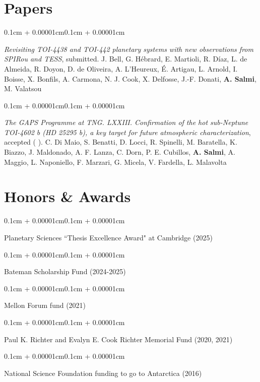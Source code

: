 \documentclass[10pt,letterpaper]{article}
\newenvironment{onecolentry}{
    \begin{adjustwidth}{0.1cm + 0.00001cm}{0.1cm + 0.00001cm}
}{
    \end{adjustwidth}
}
\let\hrefWithoutArrow\href
\renewcommand{\href}[2]{%
    \hrefWithoutArrow{#1}{%
        \ifthenelse{\equal{#2}{}}{}{#2 }%
        \raisebox{.15ex}{\footnotesize\faExternalLink*}%
    }%
}
\begin{document}
    \section{Papers}
        \begin{onecolentry}
        \textit{Revisiting TOI-4438 and TOI-442 planetary systems with new
observations from SPIRou and TESS}, submitted.
        \newline
        J. Bell, G. Hébrard, E. Martioli, R. Díaz, L. de Almeida, R. Doyon, D. de Oliveira, A. L'Heureux, É. Artigau, L. Arnold, I. Boisse, X. Bonfils, A. Carmona, N. J. Cook, X. Delfosse, J.-F. Donati, \textbf{A. Salmi}, M. Valatsou
        \end{onecolentry}
        \vspace{0.1cm}
        \vspace{0.1cm}
        \begin{onecolentry}
        \textit{The GAPS Programme at TNG. LXXIII. Confirmation of the hot sub-Neptune TOI-4602 b (HD 25295 b), a key target for future atmospheric characterization}, accepted (\href{https://arxiv.org/abs/2604.11728}{arXiv}).
        \newline
        C. Di Maio, S. Benatti, D. Locci, R. Spinelli, M. Baratella, K. Biazzo, J. Maldonado, A. F. Lanza, C. Dorn, P. E. Cubillos, \textbf{A. Salmi}, A. Maggio, L. Naponiello, F. Marzari, G. Micela, V. Fardella, L. Malavolta
        \end{onecolentry}



    \section{Honors \& Awards}
        \begin{onecolentry}
        Planetary Sciences ``Thesis Excellence Award" at Cambridge (2025)
        \end{onecolentry}
        \vspace{0.1 cm}
        \begin{onecolentry}
        Bateman Scholarship Fund (2024-2025)
        \end{onecolentry}
        \vspace{0.1 cm}
        \begin{onecolentry}
         Mellon Forum fund (2021)
        \end{onecolentry}
        \vspace{0.1 cm}
        \begin{onecolentry}
         Paul K. Richter and Evalyn E. Cook Richter Memorial Fund (2020, 2021)
        \end{onecolentry}
        \vspace{0.1 cm}
        \begin{onecolentry}
         National Science Foundation funding to go to Antarctica (2016)
        \end{onecolentry}
        
\end{document}

